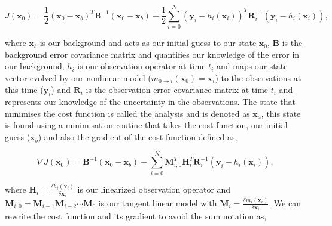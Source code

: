 \documentclass[11pt]{article}
\begin{document}
\begin{equation}
J(\textbf{x}_0) = \frac{1}{2}(\textbf{x}_0-\textbf{x}_b)^{T}\textbf{B}^{-1}(\textbf{x}_0-\textbf{x}_b)+\frac{1}{2}\sum_{i=0}^{N}(\textbf{y}_i-h_i(\textbf{x}_i))^{T}\textbf{R}_{i}^{-1}(\textbf{y}_i-h_i(\textbf{x}_i)),
\end{equation}

where $\textbf{x}_b$ is our background and acts as our initial guess to our state $\textbf{x}_0$, $\textbf{B}$ is the background error covariance matrix and quantifies our knowledge of the error in our background, $h_i$ is our observation operator at time $t_i$ and maps our state vector evolved by our nonlinear model ($m_{0\rightarrow i}(\mathbf{x}_{0})=\textbf{x}_i$) to the observations at this time ($\textbf{y}_i$) and $\textbf{R}_i$ is the observation error covariance matrix at time $t_i$ and represents our knowledge of the uncertainty in the observations. The state that minimises the cost function is called the analysis and is denoted as $\textbf{x}_a$, this state is found using a minimisation routine that takes the cost function, our initial guess ($\textbf{x}_b$) and also the gradient of the cost function defined as,

\begin{equation}
\nabla J(\textbf{x}_0) = \textbf{B}^{-1}(\textbf{x}_0-\textbf{x}_b)-\sum_{i=0}^{N}\textbf{M}_{i,0}^{T}\textbf{H}_i^{T}\textbf{R}_{i}^{-1}(\textbf{y}_i-h_i(\textbf{x}_i)),
\end{equation}

where $\textbf{H}_i = \frac{\delta h_i(\textbf{x}_i)}{\delta\textbf{x}_i}$ is our linearized observation operator and $\mathbf{M}_{i,0}=\mathbf{M}_{i-1}\mathbf{M}_{i-2}\cdots\mathbf{M}_0$ is our tangent linear model with $\mathbf{M}_i=\frac{\delta m_{i}(\textbf{x}_{i})}{\delta \textbf{x}_{i}}$. We can rewrite the cost function and its gradient to avoid the sum notation as,
\end{document}
